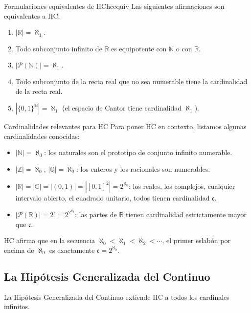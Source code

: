\begin{observacion}{Formulaciones equivalentes de HC}{hcequiv}
Las siguientes afirmaciones son equivalentes a HC:
\begin{enumerate}[leftmargin=2em, label=(\alph*)]
  \item $|\mathbb{R}| = \aleph_1$.
  \item Todo subconjunto infinito de $\mathbb{R}$ es equipotente con $\mathbb{N}$ o con $\mathbb{R}$.
  \item $|\mathcal{P}(\mathbb{N})| = \aleph_1$.
  \item Todo subconjunto de la recta real que no sea numerable tiene la cardinalidad de la recta real.
  \item $|\{0,1\}^{\mathbb{N}}| = \aleph_1$ (el espacio de Cantor tiene cardinalidad $\aleph_1$).
\end{enumerate}
\end{observacion}

\begin{ejemplo}{Cardinalidades relevantes para HC}{}
Para poner HC en contexto, listamos algunas cardinalidades conocidas:
\begin{itemize}[leftmargin=2em]
  \item $|\mathbb{N}| = \aleph_0$: los naturales son el prototipo de conjunto infinito numerable.
  \item $|\mathbb{Z}| = \aleph_0$, $|\mathbb{Q}| = \aleph_0$: los enteros y los racionales son numerables.
  \item $|\mathbb{R}| = |\mathbb{C}| = |(0,1)| = |[0,1]^2| = 2^{\aleph_0}$: los reales, los complejos, cualquier intervalo abierto, el cuadrado unitario, todos tienen cardinalidad $\mathfrak{c}$.
  \item $|\mathcal{P}(\mathbb{R})| = 2^{\mathfrak{c}} = 2^{2^{\aleph_0}}$: las partes de $\mathbb{R}$ tienen cardinalidad estrictamente mayor que $\mathfrak{c}$.
\end{itemize}
HC afirma que en la secuencia $\aleph_0 < \aleph_1 < \aleph_2 < \cdots$, el primer eslabón por encima de $\aleph_0$ es exactamente $\mathfrak{c} = 2^{\aleph_0}$.
\end{ejemplo}

\subsection{La Hipótesis Generalizada del Continuo}

La Hipótesis Generalizada del Continuo extiende HC a todos los cardinales infinitos.

